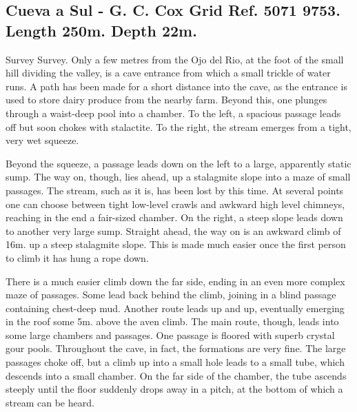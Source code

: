 \documentclass[11pt, a4paper, twoside]{memoir}
\begin{document}
\subsection*{Cueva a Sul - G. C. Cox Grid Ref. 5071 9753. Length 250m. Depth 22m.}

Survey Survey. Only a few metres from the Ojo del Rio, at the foot of the small hill dividing the valley, is a cave entrance from which a small trickle of water runs. A path has been made for a short distance into the cave, as the entrance is used to store dairy produce from the nearby farm. Beyond this, one plunges through a waist-deep pool into a chamber. To the left, a spacious passage leads off but soon chokes with stalactite. To the right, the stream emerges from a tight, very wet squeeze.

Beyond the squeeze, a passage leads down on the left to a large, apparently static sump. The way on, though, lies ahead, up a stalagmite slope into a maze of small passages. The stream, such as it is, has been lost by this time. At several points one can choose between tight low-level crawls and awkward high level chimneys, reaching in the end a fair-sized chamber. On the right, a steep slope leads down to another very large sump. Straight ahead, the way on is an awkward climb of 16m. up a steep stalagmite slope. This is made much easier once the first person to climb it has hung a rope down.

There is a much easier climb down the far side, ending in an even more complex maze of passages. Some lead back behind the climb, joining in a blind passage containing chest-deep mud. Another route leads up and up, eventually emerging in the roof some 5m. above the aven climb. The main route, though, leads into some large chambers and passages. One passage is floored with superb crystal gour pools. Throughout the cave, in fact, the formations are very fine. The large passages choke off, but a climb up into a small hole leads to a small tube, which descends into a small chamber. On the far side of the chamber, the tube ascends steeply until the floor suddenly drops away in a pitch, at the bottom of which a stream can be heard.
\end{document}
